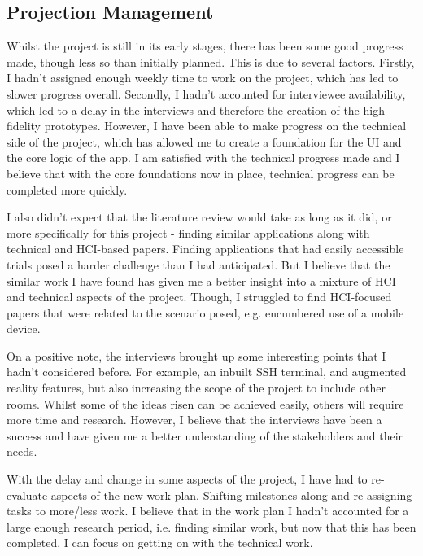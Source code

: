 \documentclass [11pt,a4paper]{article}
\begin{document}
\subsection{Projection Management}
\label{sec:project_management}

Whilst the project is still in its early stages, there has been some good progress made, though less so than initially planned. This is due to several factors. Firstly, I hadn't assigned enough weekly time to work on the project, which has led to slower progress overall. Secondly, I hadn't accounted for interviewee availability, which led to a delay in the interviews and therefore the creation of the high-fidelity prototypes. However, I have been able to make progress on the technical side of the project, which has allowed me to create a foundation for the UI and the core logic of the app. I am satisfied with the technical progress made and I believe that with the core foundations now in place, technical progress can be completed more quickly.

\pagebreak

I also didn't expect that the literature review would take as long as it did, or more specifically for this project - finding similar applications along with technical and HCI-based papers. Finding applications that had easily accessible trials posed a harder challenge than I had anticipated. But I believe that the similar work I have found has given me a better insight into a mixture of HCI and technical aspects of the project. Though, I struggled to find HCI-focused papers that were related to the scenario posed, e.g. encumbered use of a mobile device. 

On a positive note, the interviews brought up some interesting points that I hadn't considered before. For example, an inbuilt SSH terminal, and augmented reality features, but also increasing the scope of the project to include other rooms. Whilst some of the ideas risen can be achieved easily, others will require more time and research. However, I believe that the interviews have been a success and have given me a better understanding of the stakeholders and their needs.

With the delay and change in some aspects of the project, I have had to re-evaluate aspects of the new work plan. Shifting milestones along and re-assigning tasks to more/less work. I believe that in the work plan I hadn't accounted for a large enough research period, i.e. finding similar work, but now that this has been completed, I can focus on getting on with the technical work.
\end{document}
